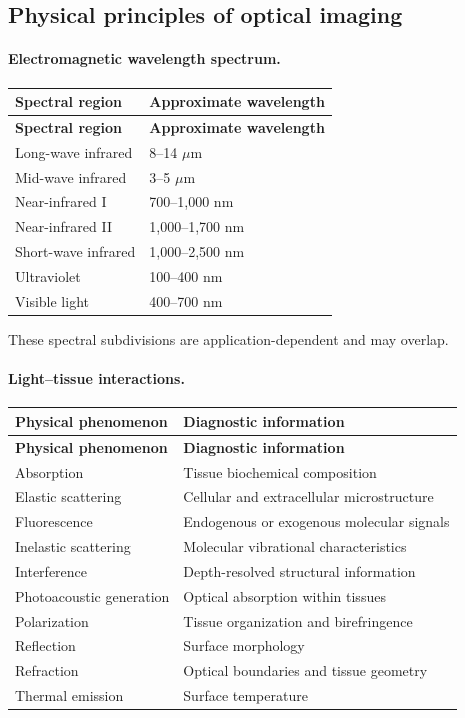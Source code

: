 \subsection{Physical principles of optical imaging}
\paragraph{Electromagnetic wavelength spectrum.}
\begin{longtable}{@{}p{}p{}@{}}
\toprule
\textbf{Spectral region} & \textbf{Approximate wavelength} \\
\midrule
\endfirsthead
\toprule
\textbf{Spectral region} & \textbf{Approximate wavelength} \\
\midrule
\endhead
Long-wave infrared & 8--14 $\mu$m \\
Mid-wave infrared & 3--5 $\mu$m \\
Near-infrared I & 700--1,000 nm \\
Near-infrared II & 1,000--1,700 nm \\
Short-wave infrared & 1,000--2,500 nm \\
Ultraviolet & 100--400 nm \\
Visible light & 400--700 nm \\
\bottomrule
\end{longtable}
These spectral subdivisions are application-dependent and may overlap.

\paragraph{Light--tissue interactions.}
\begin{longtable}{@{}p{}p{}@{}}
\toprule
\textbf{Physical phenomenon} & \textbf{Diagnostic information} \\
\midrule
\endfirsthead
\toprule
\textbf{Physical phenomenon} & \textbf{Diagnostic information} \\
\midrule
\endhead
Absorption & Tissue biochemical composition \\
Elastic scattering & Cellular and extracellular microstructure \\
Fluorescence & Endogenous or exogenous molecular signals \\
Inelastic scattering & Molecular vibrational characteristics \\
Interference & Depth-resolved structural information \\
Photoacoustic generation & Optical absorption within tissues \\
Polarization & Tissue organization and birefringence \\
Reflection & Surface morphology \\
Refraction & Optical boundaries and tissue geometry \\
Thermal emission & Surface temperature \\
\bottomrule
\end{longtable}

